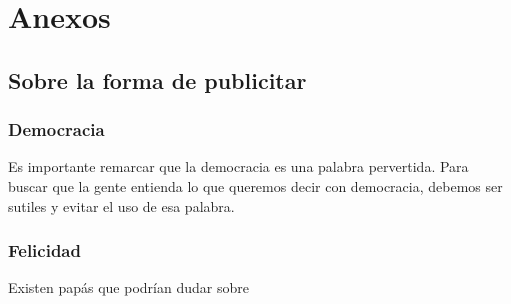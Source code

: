 \documentclass[10pt,letterpaper]{book}
\begin{document}
\chapter{Anexos}
	\section{Sobre la forma de publicitar} 
	\subsection{Democracia} Es importante remarcar que la democracia es una palabra pervertida. Para buscar que la gente entienda lo que queremos decir con democracia, debemos ser sutiles y evitar el uso de esa palabra.
	\subsection{Felicidad} Existen papás que podrían dudar sobre 
\end{document}
